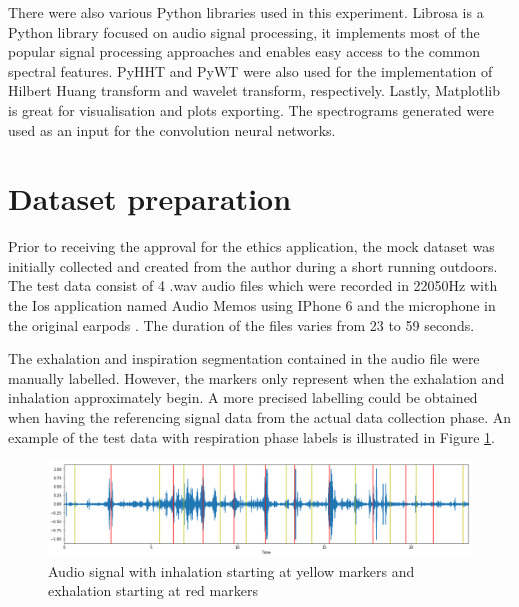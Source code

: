 There were also various Python libraries used in this experiment. Librosa is a Python library focused on audio signal processing, it implements most of the popular signal processing approaches and enables easy access to the common spectral features. PyHHT and PyWT were also used for the implementation of Hilbert Huang transform and wavelet transform, respectively. Lastly, Matplotlib is great for visualisation and plots exporting. The spectrograms generated were used as an input for the convolution neural networks.

\section{Dataset preparation}
Prior to receiving the approval for the ethics application, the mock dataset was initially collected and created from the author during a short running outdoors. The test data consist of 4 .wav audio files which were recorded in 22050Hz with the Ios application named Audio Memos using IPhone 6 and the microphone in the original earpods . The duration of the files varies from 23 to 59 seconds. 

The exhalation and inspiration segmentation contained in the audio file were manually labelled. However, the markers only represent when the exhalation and inhalation approximately begin. A more precised labelling could be obtained when having the referencing signal data from the actual data collection phase. An example of the test data with respiration phase labels is illustrated in Figure \ref{fig:audio_waveform}.

\begin{figure}[h]
    \centerline{\includegraphics[scale=0.35]{figures/audio_waveform.png}}
    \caption{Audio signal with inhalation starting at yellow markers and exhalation starting at red markers }
    \label{fig:audio_waveform}
\end{figure}

\clearpage
